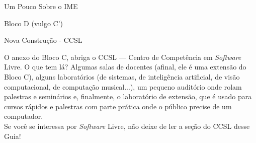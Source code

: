 \begin{secao}{Um Pouco Sobre o IME}
\begin{subsecao}{Bloco D (vulgo C')}
\end{subsecao}

\begin{subsecao}{Nova Construção - CCSL}

O anexo do Bloco C, abriga o CCSL --- Centro de Competência em \textit{Software} Livre. O que tem lá? Algumas salas de docentes (afinal, ele é uma extensão do
 Bloco C), alguns laboratórios (de sistemas, de inteligência artificial,
 de visão computacional, de computação musical...), um pequeno auditório
 onde rolam palestras e seminários e, finalmente, o laboratório de extensão,
 que é usado para cursos rápidos e palestras com parte prática onde o público
 precise de um computador.\\
Se você se interessa por \textit{Software} Livre, não deixe de ler a seção do CCSL desse Guia!

\end{subsecao}
\end{secao}
